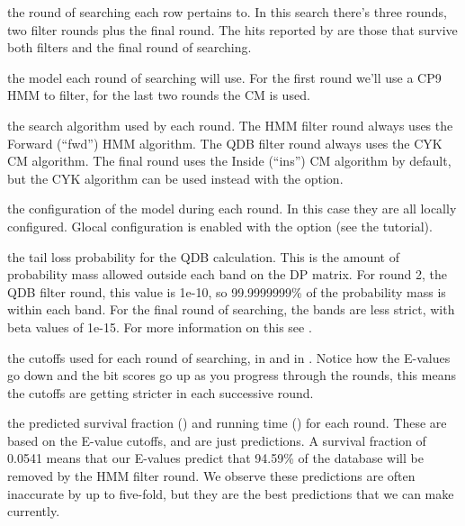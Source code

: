 \begin{wideitem}
\item[\emprog{rnd}] the round of searching each row pertains
  to. In this search there's three rounds, two filter rounds plus
  the final round. The hits reported by  are those that
  survive both filters and the final round of searching.

\item[\emprog{mod}] the model each round of searching will use. For
  the first round we'll use a CP9 HMM to filter, for the last two
  rounds the CM is used.

\item[\emprog{alg}] the search algorithm used by each round. 
  The HMM filter round always uses the Forward (``fwd'') HMM algorithm. 
  The QDB filter round always uses the CYK CM algorithm. The final
  round uses the Inside (``ins'') CM algorithm by default, but the 
  CYK algorithm can be used instead with the  option. 

\item[\emprog{cfg}] the configuration of the model during each
  round. In this case they are all locally configured. Glocal
  configuration is enabled with the  option (see the tutorial).

\item[\emprog{beta}] the tail loss probability for the QDB
  calculation. This is the amount of probability mass allowed outside
  each band on the DP matrix. For round 2, the QDB filter round, this
  value is 1e-10, so 99.9999999\% of the probability mass is within each
  band. For the final round of searching, the bands are less strict,
  with beta values of 1e-15. For more information on this see
  \cite{NawrockiEddy07}.

\item[\emprog{cutoffs}] the cutoffs used for each round of searching,
  in  and in . Notice how the E-values go
  down and the bit scores go up as you progress through the rounds,
  this means the cutoffs are getting stricter in each successive
  round. 

\item[\emprog{predictions}] the predicted survival fraction
  () and running time () for each
  round. These are based on the E-value cutoffs, and are just
  predictions. A survival fraction of 0.0541 means that our E-values
  predict that 94.59\% of the database will be removed by the HMM
  filter round. We observe these predictions are often inaccurate by up
  to five-fold, but they are the best predictions
  that we can make currently.
\end{wideitem}

